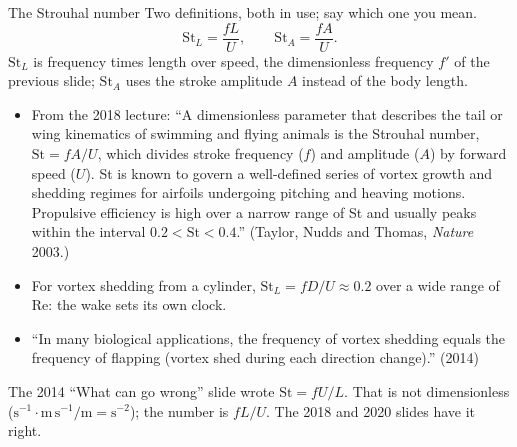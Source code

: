 \documentclass[aspectratio=169,11pt]{beamer}
\begin{document}
\begin{frame}{The Strouhal number}
\label{fr:strouhal}
\small\setlength{\abovedisplayskip}{3pt}\setlength{\belowdisplayskip}{3pt} Two definitions, both in use; say which one you mean.
\[
  \mathrm{St}_L = \frac{fL}{U}, \qquad \mathrm{St}_A = \frac{fA}{U}.
\]
$\mathrm{St}_L$ is frequency times length over speed, the dimensionless frequency $f'$ of the previous slide; $\mathrm{St}_A$ uses the stroke amplitude $A$ instead of the body length.
\begin{itemize}\footnotesize
  \item From the 2018 lecture: ``A dimensionless parameter that describes the tail or wing kinematics of swimming and flying animals is the Strouhal number, $\mathrm{St} = fA/U$, which divides stroke frequency ($f$) and amplitude ($A$) by forward speed ($U$). St is known to govern a well-defined series of vortex growth and shedding regimes for airfoils undergoing pitching and heaving motions. Propulsive efficiency is high over a narrow range of St and usually peaks within the interval $0.2 < \mathrm{St} < 0.4$.'' (Taylor, Nudds and Thomas, \emph{Nature} 2003.)
  \item For vortex shedding from a cylinder, $\mathrm{St}_L = fD/U \approx 0.2$ over a wide range of $\mathrm{Re}$: the wake sets its own clock.
  \item ``In many biological applications, the frequency of vortex shedding equals the frequency of flapping (vortex shed during each direction change).'' (2014)
\end{itemize}
\begin{punchbox}
\footnotesize {} The 2014 ``What can go wrong'' slide wrote $\mathrm{St} = fU/L$. That is not dimensionless ($\mathrm{s}^{-1}\cdot\mathrm{m\,s^{-1}}/\mathrm{m} = \mathrm{s}^{-2}$); the number is $fL/U$. The 2018 and 2020 slides have it right.
\end{punchbox}
\end{frame}
\end{document}
